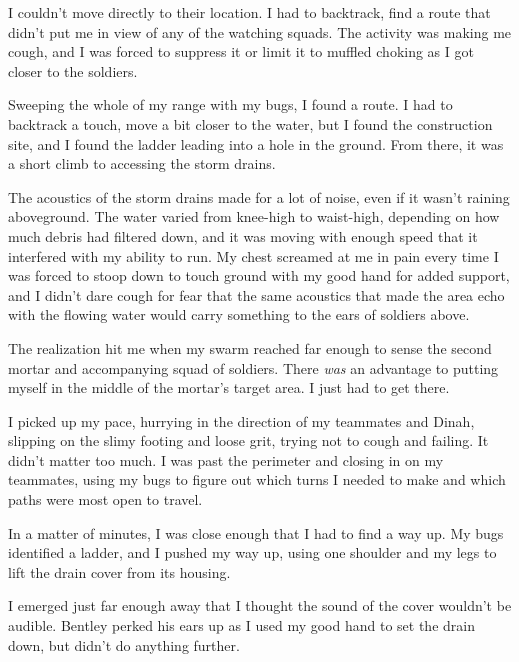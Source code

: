 I couldn't move directly to their location.  I had to backtrack, find a route that didn't put me in view of any of the watching squads.  The activity was making me cough, and I was forced to suppress it or limit it to muffled choking as I got closer to the soldiers.



Sweeping the whole of my range with my bugs, I found a route.  I had to backtrack a touch, move a bit closer to the water, but I found the construction site, and I found the ladder leading into a hole in the ground.  From there, it was a short climb to accessing the storm drains.



The acoustics of the storm drains made for a lot of noise, even if it wasn't raining aboveground.  The water varied from knee-high to waist-high, depending on how much debris had filtered down, and it was moving with enough speed that it interfered with my ability to run.  My chest screamed at me in pain every time I was forced to stoop down to touch ground with my good hand for added support, and I didn't dare cough for fear that the same acoustics that made the area echo with the flowing water would carry something to the ears of soldiers above.



The realization hit me when my swarm reached far enough to sense the second mortar and accompanying squad of soldiers.  There \emph{was} an advantage to putting myself in the middle of the mortar's target area.  I just had to get there.



I picked up my pace, hurrying in the direction of my teammates and Dinah, slipping on the slimy footing and loose grit, trying not to cough and failing.  It didn't matter too much.  I was past the perimeter and closing in on my teammates, using my bugs to figure out which turns I needed to make and which paths were most open to travel.



In a matter of minutes, I was close enough that I had to find a way up.  My bugs identified a ladder, and I pushed my way up, using one shoulder and my legs to lift the drain cover from its housing.



I emerged just far enough away that I thought the sound of the cover wouldn't be audible.  Bentley perked his ears up as I used my good hand to set the drain down, but didn't do anything further.



